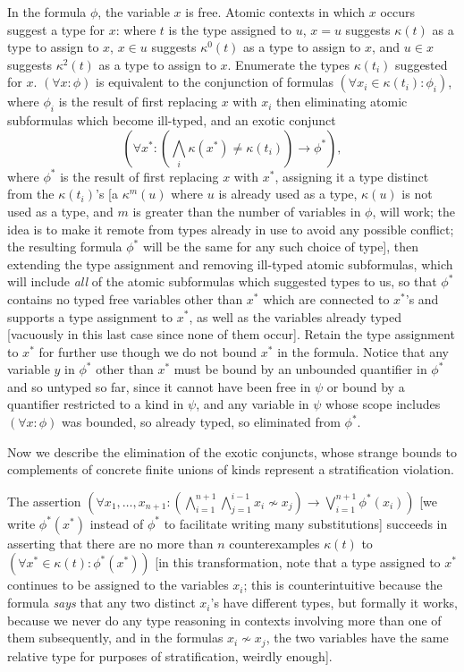 \documentclass[12pt]{article}
\begin{document}
\begin{description}
In the formula $\phi$, the variable $x$ is free.  Atomic contexts in which $x$ occurs suggest a type for $x$:  where $t$ is the type assigned to $u$, $x=u$ suggests $\kappa(t)$ as a type to assign to $x$, $x \in u$ suggests $\kappa^0(t)$ as a type to assign to $x$, and $u \in x$ suggests $\kappa^2(t)$ as a type to assign to $x$.
Enumerate the types $\kappa(t_i)$ suggested for $x$.  $(\forall x:\phi)$ is equivalent to the conjunction of formulas $(\forall x_i \in \kappa(t_i):\phi_i)$, where $\phi_i$ is the result of first replacing $x$ with $x_i$ then eliminating atomic subformulas
which become ill-typed, and an exotic conjunct $$(\forall x^*:(\bigwedge_i \kappa(x^*) \neq \kappa(t_i))\rightarrow \phi^*),$$ where $\phi^*$ is the result of first replacing $x$ with $x^*$, assigning it a type distinct from the $\kappa(t_i)$'s [a $\kappa^m(u)$ where $u$ is already used as a type, $\kappa(u)$ is not used as a type, and $m$ is greater than the number of variables in $\phi$, will work;  the idea is to make it remote from types already in use to avoid any possible conflict;  the resulting formula $\phi^*$ will be the same for any such choice of type], then extending the type assignment and removing ill-typed atomic subformulas, which will include  {\em all\/} of the atomic subformulas which suggested types to us, so that $\phi^*$ contains no typed free variables other than $x^*$ which are connected to $x^*$'s and supports a type assignment to $x^*$, as well as the variables already typed [vacuously in this last case since none of them occur].  Retain the type assignment to $x^*$ for further use though we do not bound $x^*$ in the formula.  Notice that any variable $y$ in $\phi^*$ other than $x^*$ must be bound by an unbounded quantifier in $\phi^*$ and so untyped so far, since it  cannot have been free in $\psi$ or bound by a quantifier restricted to a kind in $\psi$, and any variable in $\psi$ whose scope includes $(\forall x:\phi)$ was bounded, so already typed, so eliminated from $\phi^*$.

Now we describe the elimination of the exotic conjuncts, whose strange bounds to complements of concrete finite unions of kinds represent a stratification violation.   

The assertion $(\forall x_1,\ldots,x_{n+1}: (\bigwedge_{i=1}^{n+1} \bigwedge_{j=1}^{i-1} x_i \not\sim x_j) \rightarrow \bigvee_{i=1}^{n+1}\phi^*(x_i))$  [we write $\phi^*(x^*)$ instead of $\phi^*$ to facilitate writing many substitutions] succeeds in asserting that there are no more than $n$ counterexamples $\kappa(t)$ to $(\forall x^* \in \kappa(t):\phi^*(x^*))$ [in this transformation, note that a type assigned to $x^*$ continues to be assigned to the variables $x_i$; this is counterintuitive because the formula {\em says\/} that any  two distinct $x_i$'s have different types, but formally it works, because we never do any type reasoning in contexts involving more than one of them subsequently, and in the formulas $x_i \not\sim x_j$, the two variables have the same relative type for purposes of stratification, weirdly enough].


\end{description}
\end{document}
